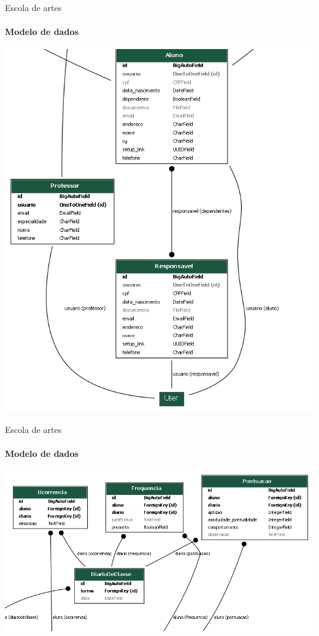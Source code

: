 \begin{frame}{Escola de artes}
\framesubtitle{Modelo de dados}

\begin{center}
\includegraphics[scale=0.33]{beamerthemesrc/assets/er_diagram_escola_aluno.png}
\end{center}


\end{frame}

\begin{frame}{Escola de artes}
\framesubtitle{Modelo de dados}

\begin{center}
\includegraphics[height=\textheight]{beamerthemesrc/assets/er_diagram_escola_diario.png}
\end{center}


\end{frame}


